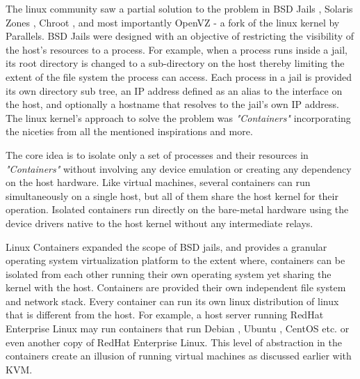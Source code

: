 The linux community saw a partial solution to the problem in BSD Jails \cite{jails}, Solaris Zones \cite{zones}, Chroot \cite{chroot}, and most importantly OpenVZ \cite{openvz} - a fork of the linux kernel by Parallels. BSD Jails were designed with an objective of restricting the visibility of the host's resources to a process. For example, when a process runs inside a jail, its root directory is changed to a sub-directory on the host thereby limiting the extent of the file system the process can access. Each process in a jail is provided its own directory sub tree, an IP address defined as an alias to the interface on the host, and optionally a hostname that resolves to the jail's own IP address. The linux kernel's approach to solve the problem was \emph{"Containers"} incorporating the niceties from all the mentioned inspirations and more. 


The core idea is to isolate only a set of processes and their resources in \emph{"Containers"} without involving any device emulation or creating any dependency on the host hardware. Like virtual machines, several containers can run simultaneously on a single host, but all of them share the host kernel for their operation. Isolated containers run directly on the bare-metal hardware using the device drivers native to the host kernel without any intermediate relays. 


Linux Containers expanded the scope of BSD jails, and provides a granular operating system virtualization platform to the extent where, containers can be isolated from each other running their own operating system yet sharing the kernel with the host. Containers are provided their own independent file system and network stack. Every container can run its own linux distribution of linux that is different from the host. For example, a host server running RedHat Enterprise Linux \cite{rhel} may run containers that run Debian \cite{debian}, Ubuntu \cite{ubuntu}, CentOS \cite{centos} etc. or even another copy of RedHat Enterprise Linux. This level of abstraction in the containers create an illusion of running virtual machines as discussed earlier with KVM.  

